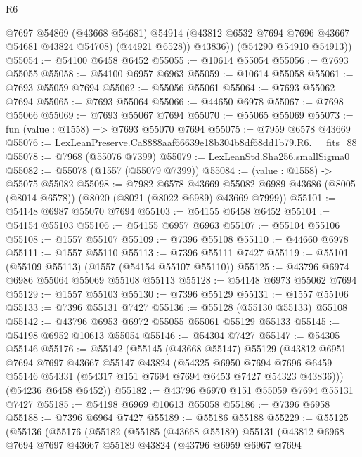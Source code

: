 \begin{lexlean}{R6}
\begin{coremodule}
            @7697
            @54869
            (@43668 @54681)
            @54914
            (@43812 @6532 @7694 @7696 @43667 @54681 @43824 @54708)
            (@44921 @6528))
          @43836))
      (@54290 @54910 @54913))
@55054 := @54100 @6458 @6452
@55055 := @10614 @55054
@55056 := @7693 @55055
@55058 := @54100 @6957 @6963
@55059 := @10614 @55058
@55061 := @7693 @55059 @7694
@55062 := @55056 @55061
@55064 := @7693 @55062 @7694
@55065 := @7693 @55064
@55066 := @44650 @6978
@55067 := @7698 @55066
@55069 := @7693 @55067 @7694
@55070 := @55065 @55069
@55073 := fun (value : @1558) => @7693 @55070 @7694
@55075 := @7959 @6578 @43669
@55076 := LexLeanPreserve.Ca8888aaf66639e18b304b8df68dd1b79.R6.__fits_88
@55078 := @7968 (@55076 @7399)
@55079 := LexLeanStd.Sha256.smallSigma0
@55082 := @55078 (@1557 (@55079 @7399))
@55084 := (value : @1558) -> @55075 @55082
@55098 := @7982
    @6578
    @43669
    @55082
    @6989
    @43686
    (@8005 (@8014 @6578))
    (@8020 (@8021 (@8022 @6989) @43669 @7999))
@55101 := @54148 @6987 @55070 @7694
@55103 := @54155 @6458 @6452
@55104 := @54154 @55103
@55106 := @54155 @6957 @6963
@55107 := @55104 @55106
@55108 := @1557 @55107
@55109 := @7396 @55108
@55110 := @44660 @6978
@55111 := @1557 @55110
@55113 := @7396 @55111 @7427
@55119 := @55101 (@55109 @55113) (@1557 (@54154 @55107 @55110))
@55125 := @43796 @6974 @6986 @55064 @55069 @55108 @55113
@55128 := @54148 @6973 @55062 @7694
@55129 := @1557 @55103
@55130 := @7396 @55129
@55131 := @1557 @55106
@55133 := @7396 @55131 @7427
@55136 := @55128 (@55130 @55133) @55108
@55142 := @43796 @6953 @6972 @55055 @55061 @55129 @55133
@55145 := @54198 @6952 @10613 @55054
@55146 := @54304 @7427
@55147 := @54305 @55146
@55176 := @55142
    (@55145
      (@43668 @55147)
      @55129
      (@43812
        @6951
        @7694
        @7697
        @43667
        @55147
        @43824
        (@54325
          @6950
          @7694
          @7696
          @6459
          @55146
          @54331
          (@54317 @151 @7694 @7694 @6453 @7427 @54323 @43836)))
      (@54236 @6458 @6452))
@55182 := @43796 @6970 @151 @55059 @7694 @55131 @7427
@55185 := @54198 @6969 @10613 @55058
@55186 := @7396 @6958
@55188 := @7396 @6964 @7427
@55189 := @55186 @55188
@55229 := @55125
    (@55136
      (@55176
        (@55182
          (@55185
            (@43668 @55189)
            @55131
            (@43812
              @6968
              @7694
              @7697
              @43667
              @55189
              @43824
              (@43796
                @6959
                @6967
                @7694

\end{coremodule}
\end{lexlean}
